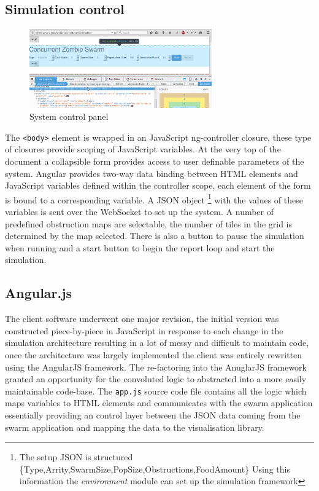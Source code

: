 \subsection{Simulation control}
\begin{figure}[h]
  \centering
  \includegraphics[width=0.7\textwidth]{img/panel.png}
\caption{System control panel}
    \label{fig:control-panel}
\end{figure}
The \verb+<body>+ element is wrapped in an JavaScript ng-controller closure, these type of closures provide scoping of JavaScript variables.
At the very top of the document a collapsible form provides access to user definable parameters of the system. Angular provides two-way data binding between HTML elements and JavaScript variables defined within the controller scope, each element of the form is bound to a corresponding variable.
A JSON object \footnote{The setup JSON is structured \{Type,Arrity,SwarmSize,PopSize,Obstructions,FoodAmount\} Using this information the \emph{environment} module can set up the simulation framework } with the values of these variables is sent over the WebSocket to set up the system. A number of predefined obstruction maps are selectable, the number of tiles in the grid is determined by the map selected. There is also a button to pause the simulation when running and a start button to begin the report loop and start the simulation.
\subsection{Angular.js}
The client software underwent one major revision, the initial version was constructed piece-by-piece in JavaScript in response to each change in the simulation architecture resulting in a lot of messy and difficult to maintain code, once the architecture was largely implemented the client was entirely rewritten using the AngularJS framework. The re-factoring into the AnuglarJS framework granted an opportunity for the convoluted logic to abstracted into a more easily maintainable code-base. The {\tt{app.js}}
source code file contains all the logic which maps variables to HTML elements and communicates with the swarm application essentially providing an control layer between the JSON data coming from the swarm application and mapping the data to the visualisation library.
